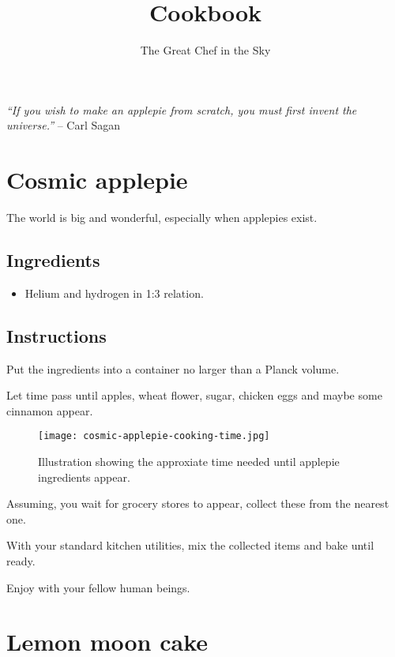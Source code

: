 \documentclass[11pt]{article}
\title{Cookbook}
\author{The Great Chef in the Sky}
\begin{document}
\maketitle

\begin{displayquote}
\emph{``If you wish to make an applepie from scratch, you must first invent the universe.''}
-- Carl Sagan
\end{displayquote}


\tableofcontents
\pagebreak

\section{Cosmic applepie}

The world is big and wonderful, especially when applepies exist.

\subsection*{Ingredients}

\begin{itemize}
\item Helium and hydrogen in 1:3 relation.
\end{itemize}

\subsection*{Instructions}

Put the ingredients into a container no larger than a Planck volume.

Let time pass until apples, wheat flower, sugar, chicken eggs and maybe some cinnamon appear.

\begin{figure}[h]
\centering
\texttt{[image: cosmic-applepie-cooking-time.jpg]}
\caption{Illustration showing the approxiate time needed until applepie ingredients appear.}
\end{figure}


Assuming, you wait for grocery stores to appear, collect these from the nearest one.

With your standard kitchen utilities, mix the collected items and bake until ready.

Enjoy with your fellow human beings.

\section{Lemon moon cake}
\end{document}
